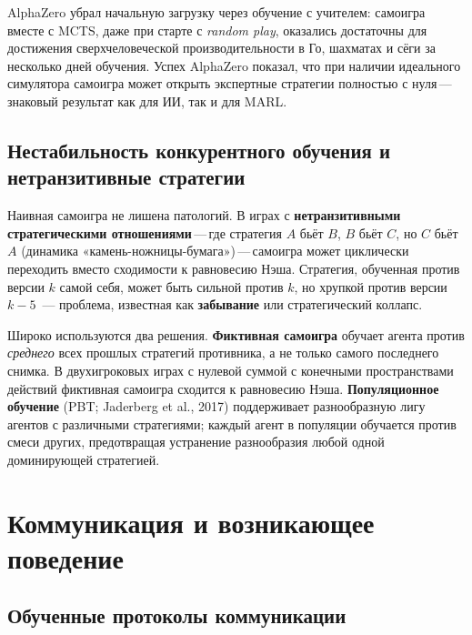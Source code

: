 AlphaZero убрал начальную загрузку через обучение с учителем:
самоигра вместе с MCTS, даже при старте с \emph{random play},
оказались достаточны для достижения сверхчеловеческой производительности в Го, шахматах
и сёги за несколько дней обучения. Успех AlphaZero
показал, что при наличии идеального симулятора самоигра может открыть
экспертные стратегии полностью с нуля\,---\,знаковый результат как для
ИИ, так и для MARL.

\subsection{Нестабильность конкурентного обучения и нетранзитивные стратегии}

Наивная самоигра не лишена патологий. В играх с
\textbf{нетранзитивными стратегическими отношениями}\,---\,где стратегия
$A$ бьёт $B$, $B$ бьёт $C$, но $C$ бьёт $A$ (динамика «камень-ножницы-бумага»)\,---\,самоигра может циклически переходить вместо сходимости
к равновесию Нэша. Стратегия, обученная против версии $k$ самой себя,
может быть сильной против $k$, но хрупкой против версии $k-5$~--- проблема,
известная как \textbf{забывание} или
стратегический коллапс.

Широко используются два решения. \textbf{Фиктивная
самоигра} обучает агента против
\emph{среднего} всех прошлых стратегий противника, а не только самого последнего
снимка. В двухигроковых играх с нулевой суммой с конечными пространствами действий
фиктивная самоигра сходится к равновесию Нэша.
\textbf{Популяционное обучение}
(PBT; Jaderberg et al., 2017) поддерживает разнообразную лигу агентов с
различными стратегиями; каждый агент в популяции обучается против
смеси других, предотвращая устранение разнообразия любой одной доминирующей стратегией.

\section{Коммуникация и возникающее поведение}
\label{sec:communication}

\subsection{Обученные протоколы коммуникации}

